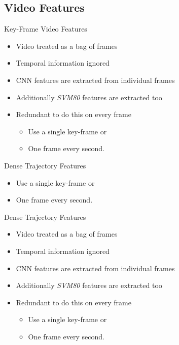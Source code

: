 \documentclass{beamer}
\begin{document}
\subsection{Video Features}
\begin{frame}{Key-Frame Video Features}
    \begin{itemize}
        \item Video treated as a bag of frames
        \item Temporal information ignored 
        \item CNN features are extracted from individual frames 
        \item Additionally \emph{SVM80} features are extracted too 
        \item Redundant to do this on every frame 
           \begin{itemize}
               \item Use a single key-frame or
               \item One frame every second.
           \end{itemize}
    \end{itemize}
\end{frame}
\begin{frame}{Dense Trajectory Features}
    \begin{itemize}
           \begin{itemize}
               \item Use a single key-frame or
               \item One frame every second.
           \end{itemize}
    \end{itemize}
\end{frame}
\begin{frame}{Dense Trajectory Features}
    \begin{itemize}
        \item Video treated as a bag of frames
        \item Temporal information ignored 
        \item CNN features are extracted from individual frames 
        \item Additionally \emph{SVM80} features are extracted too 
        \item Redundant to do this on every frame 
           \begin{itemize}
               \item Use a single key-frame or
               \item One frame every second.
           \end{itemize}
    \end{itemize}
\end{frame}
\end{document}

